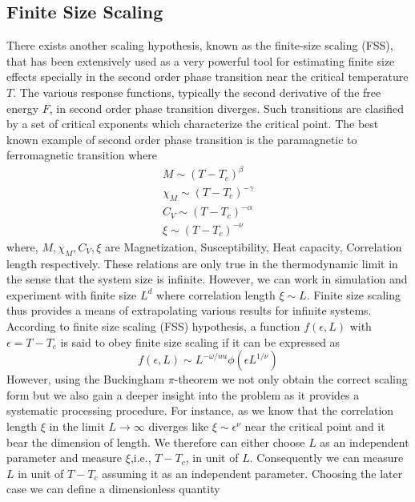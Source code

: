 	\subsection{Finite Size Scaling}
	There exists another scaling hypothesis, known as the finite-size scaling (FSS), that has been extensively used as a very powerful tool for estimating finite size effects specially in the second order phase transition near the critical temperature $T$. The various response functions, typically the second derivative of the free energy $F$, in second order phase transition diverges. Such transitions are clasified by a set of critical exponents which characterize the critical point. The best known example of second order phase transition is the paramagnetic to ferromagnetic transition where
	\begin{align}
		M \sim (T-T_c)^\beta \\
		\chi_M \sim (T-T_c)^{-\gamma} \\
		C_V \sim (T-T_c)^{-\alpha} \\
		\xi \sim (T-T_c)^{-\nu}
	\end{align}
	where, $M, \chi_M, C_V, \xi$ are Magnetization, Susceptibility, Heat capacity, Correlation length respectively. These relations are only true in the thermodynamic limit in the sense that the system size is infinite. However, we can work in simulation and experiment with finite size $L^d$ where correlation length $\xi \sim L$. Finite size scaling thus provides a means of extrapolating various results for infinite systems. \\
	According to finite size scaling (FSS) hypothesis, a function $f(\epsilon, L)$ with $\epsilon = T-T_c$ is said to obey finite size scaling if it can be expressed as 
	\begin{equation}
		f(\epsilon, L) \sim L^{-\omega/nu} \phi(\epsilon L^{1/\nu})
		\label{fss 1}
	\end{equation}
	However, using the Buckingham $\pi$-theorem we not only obtain the correct scaling form but we also gain a deeper insight into the problem as it provides a systematic processing procedure. For instance, as we know that the correlation length $\xi$ in the limit $L \rightarrow \infty$ diverges like $\xi \sim \epsilon^\nu$ near the critical point and it bear the dimension of length. We therefore can either choose $L$ as an independent parameter and measure $\xi$,i.e., $T-T_c$, in unit of $L$. Consequently we can measure $L$ in unit of $T-T_c$ assuming it as an independent parameter. Choosing the later case we can define a dimensionless quantity

